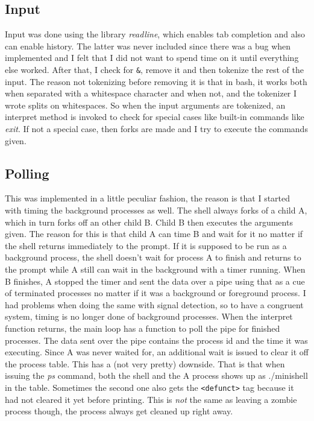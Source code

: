 \documentclass{article}
\begin{document}
    \subsection{Input}
        Input was done using the library \emph{readline}, which enables tab
        completion and also can enable history. The latter was never included
        since there was a bug when implemented and I felt that I did not want
        to spend time on it until everything else worked. After that, I check
        for \texttt{\&}, remove it and then tokenize the rest of the input.
        The reason not tokenizing before removing it is that in bash, it
        works both when separated with a whitespace character and when not,
        and the tokenizer I wrote splits on whitespaces. So when the input
        arguments are tokenized, an interpret method is invoked to check
        for special cases like built-in commands like \emph{exit}. If not a
        special case, then forks are made and I try to execute the commands
        given. 
    \subsection{Polling}
        This was implemented in a little peculiar fashion, the reason is
        that I started with timing the background processes as well.
        The shell always forks of a child A, which in turn forks off an
        other child B. Child B then executes the arguments given. The
        reason for this is that child A can time B and wait for it no matter
        if the shell returns immediately to the prompt. If it is supposed to
        be run as a background process, the shell doesn't wait for process A
        to finish and returns to the prompt while A still can wait in the
        background with a timer running. When B finishes, A stopped the timer
        and sent the data over a pipe using that as a cue of terminated
        processes no matter if it was a background or foreground process.
        I had problems when doing the same with signal detection, so to
        have a congruent system, timing is no longer done of background
        processes. When the interpret function returns, the main loop has a
        function to poll the pipe for finished processes. The data sent over
        the pipe contains the process id and the time it was executing.
        Since A was never waited for, an additional wait is issued to clear
        it off the process table. This has a (not very pretty) downside. That
        is that when issuing the \emph{ps} command, both the shell and the A
        process shows up as ./minishell in the table. Sometimes the second one
        also gets the \texttt{<defunct>} tag because it had not cleared it yet
        before printing. This is \emph{not} the same as leaving a zombie
        process though, the process always get cleaned up right away.
\end{document}
